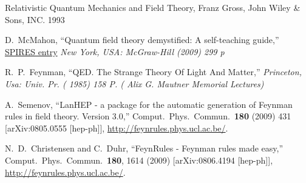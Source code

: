 \begin{thebibliography}{99}
Relativistic Quantum Mechanics and Field Theory, Franz Gross, John Wiley \& Sons, INC. 1993

  D.~McMahon,
  ``Quantum field theory demystified: A self-teaching guide,''
  \href{http://www.slac.stanford.edu/spires/find/hep/www?irn=8432112}{SPIRES entry}
{\it  New York, USA: McGraw-Hill (2009) 299 p}

  R.~P.~Feynman,
  ``QED. The Strange Theory Of Light And Matter,''
{\it  Princeton, Usa: Univ. Pr. ( 1985) 158 P. ( Alix G. Mautner Memorial Lectures)}


  A.~Semenov,
  ``LanHEP - a package for the automatic generation of Feynman rules in field
  theory. Version 3.0,''
  Comput.\ Phys.\ Commun.\  {\bf 180} (2009) 431
  [arXiv:0805.0555 [hep-ph]], \url{http://feynrules.phys.ucl.ac.be/}.

  N.~D.~Christensen and C.~Duhr,
  ``FeynRules - Feynman rules made easy,''
  Comput.\ Phys.\ Commun.\  {\bf 180}, 1614 (2009)
  [arXiv:0806.4194 [hep-ph]],
   \url{http://feynrules.phys.ucl.ac.be/}.

\end{thebibliography}
